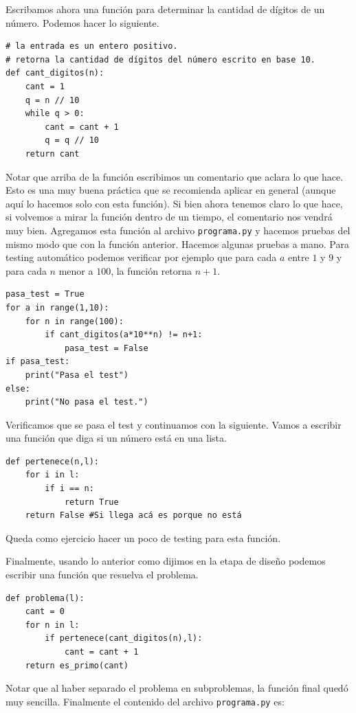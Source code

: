 \documentclass[a4paper, 12pt]{report}
\theoremstyle{definition}
\begin{document}
Escribamos ahora una función para determinar la cantidad de dígitos de un número. Podemos hacer lo siguiente.
\begin{verbatim}
# la entrada es un entero positivo.
# retorna la cantidad de dígitos del número escrito en base 10.
def cant_digitos(n):
    cant = 1
    q = n // 10
    while q > 0:
        cant = cant + 1
        q = q // 10
    return cant
\end{verbatim}
Notar que arriba de la función escribimos un comentario que aclara lo que hace. Esto es una muy buena práctica que se recomienda aplicar en general (aunque aquí lo hacemos solo con esta función). Si bien ahora tenemos claro lo que hace, si volvemos a mirar la función dentro de un tiempo, el comentario nos vendrá muy bien. Agregamos esta función al archivo {\tt programa.py} y hacemos pruebas del mismo modo que con la función anterior. Hacemos algunas pruebas a mano. Para testing automático podemos verificar por ejemplo que para cada $a$ entre $1$ y $9$ y para cada $n$ menor a $100$, la función retorna $n+1$.
\begin{verbatim}
pasa_test = True
for a in range(1,10):
    for n in range(100):
        if cant_digitos(a*10**n) != n+1:
            pasa_test = False
if pasa_test:
    print("Pasa el test")
else:
    print("No pasa el test.")
\end{verbatim}
Verificamos que se pasa el test y continuamos con la siguiente. Vamos a escribir una función que diga si un número está en una lista.
\begin{verbatim}
def pertenece(n,l):
    for i in l:
        if i == n:
            return True
    return False #Si llega acá es porque no está
\end{verbatim}
Queda como ejercicio hacer un poco de testing para esta función.

Finalmente, usando lo anterior como dijimos en la etapa de diseño podemos escribir una función que resuelva el problema.
\begin{verbatim}
def problema(l):
    cant = 0
    for n in l:
        if pertenece(cant_digitos(n),l):
            cant = cant + 1
    return es_primo(cant)
\end{verbatim}
Notar que al haber separado el problema en subproblemas, la función final quedó muy sencilla. Finalmente el contenido del archivo {\tt programa.py} es:
\end{document}
